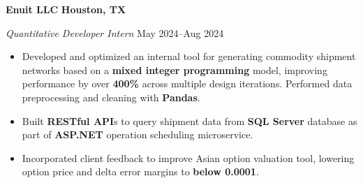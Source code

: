 \textbf{Enuit LLC} \hfill \textbf{Houston, TX}\par
\textit{Quantitative Developer Intern} \hfill May 2024--Aug 2024
\begin{itemize}
	\item Developed and optimized an internal tool for generating commodity shipment networks based on a \textbf{mixed integer programming} model, improving performance by over \textbf{400\%} across multiple design iterations. Performed data preprocessing and cleaning with \textbf{Pandas}.
	\item Built \textbf{RESTful API}s to query shipment data from \textbf{SQL Server} database as part of \textbf{ASP.NET} operation scheduling microservice.
		\item Incorporated client feedback to improve Asian option valuation tool, lowering option price and delta error margins to \textbf{below 0.0001}.
\end{itemize}\par


